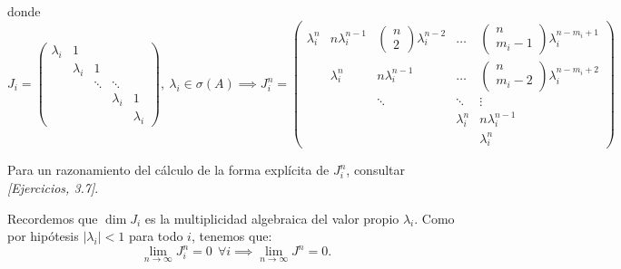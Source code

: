 \documentclass[11pt, a4paper]{article}
\makeatletter
\newif\IfInSansMode
\let\oldsf\sffamily
\renewcommand*{\sffamily}{\oldsf\mathversion{sans}\InSansModetrue}
\let\oldnorm\normalfont
\renewcommand*{\normalfont}{\oldnorm\InSansModefalse\mathversion{normal}}
\renewenvironment{proof}[1][\proofname] {\vspace{-15pt}\par\pushQED{\qed}\normalfont\topsep6\p@\@plus6\p@\relax\trivlist\item[\hskip\labelsep\it#1\@addpunct{.}]\ignorespaces}{\popQED\endtrivlist\@endpefalse}
\numberwithin{equation}{section}
\renewenvironment{proof}[1][\proofname] {\par\pushQED{\qed}\normalfont\topsep6\p@\@plus6\p@\relax\trivlist\item[\hskip\labelsep\itshape\sffamily#1\@addpunct{.}]\ignorespaces}{\popQED\endtrivlist\@endpefalse}
\theoremstyle{theorem-style}
\theoremstyle{definition-style}
\theoremstyle{remark-style}
\theoremstyle{example-style}
\makeatother
\begin{document}
\begin{proof}
    donde $$J_i = \begin{pmatrix}
        \lambda_i & 1 & & & \\
                  & \lambda_i & 1 & \\
                  & & \ddots & \ddots  \\
                  & & & \lambda_i & 1\\
        & & & & \lambda_i
    \end{pmatrix}, \ \lambda_i \in \sigma(A) \implies J_i^n = \begin{pmatrix}
                \lambda_i^n & n\lambda_i^{n-1} & \begin{pmatrix}
                n\\
                2
\end{pmatrix} \lambda_i^{n-2} & \hdots & \begin{pmatrix}
                    n \\
                    m_i-1
                \end{pmatrix} \lambda_i^{n-m_i +1} \\
                 & \lambda_i^n & n\lambda_i^{n-1} & \hdots & \begin{pmatrix}
	        n\\
	        m_i-2
\end{pmatrix} \lambda_i^{n-m_i+2}\\
                                             &  & \ddots & \ddots & \vdots \\
                                            & & & \lambda_i^n & n\lambda_i^{n-1}\\
                                            & & & & \lambda_i^n
            \end{pmatrix}$$
    
    Para un razonamiento del cálculo de la forma explícita de $J_i^n$, consultar \textit{[Ejercicios, 3.7]}.

    Recordemos que $\dim J_i$ es la multiplicidad algebraica del valor propio $\lambda_i$. Como por hipótesis $|\lambda_i| < 1$ para todo $i$, tenemos que: $$\lim_{n \to \infty} J_i^n = 0 \ \  \forall i \implies \lim_{n\to\infty} J^n = 0.$$
\end{proof}
\end{document}
